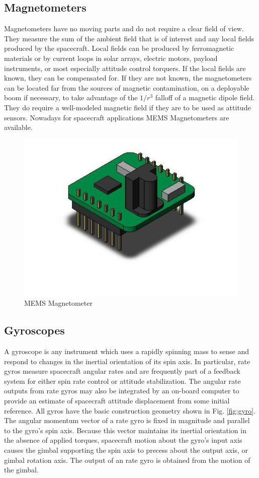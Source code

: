 \documentclass[11pt,a4paper]{report}
\begin{document}
\subsection{Magnetometers}
Magnetometers have no moving parts and do not require a clear field of view.
They measure the sum of the ambient field that is of interest and any local fields produced by the spacecraft. Local fields can be produced by ferromagnetic materials or by current loops in solar arrays, electric motors, payload instruments, or most especially attitude control torquers. If the local fields are known, they can be compensated for. If they are not known, the magnetometers can be located far from the sources of magnetic contamination, on a deployable boom if necessary, to take advantage of the $1/r^3$ falloff of a magnetic dipole field. They do require a well-modeled magnetic field if they are to be used as attitude sensors. Nowadays for spacecraft applications MEMS Magnetometers are available.

\begin{figure}[H]
 	\centering
 	\includegraphics[scale=1]{gfx/magnetometer.jpg}
    \caption{MEMS Magnetometer}
\end{figure}

\subsection{Gyroscopes}
A gyroscope is any instrument which uses a rapidly spinning mass to sense and respond to changes in the inertial orientation of its spin axis.
In particular, rate gyros measure spacecraft angular rates and are frequently part of a feedback system for either spin rate control or attitude stabilization. The angular rate outputs from rate gyros may also be integrated by an on-board computer to provide an estimate of spacecraft attitude displacement from some initial reference. 
All gyros have the basic construction geometry shown in Fig. \ref{fig:gyro}.
The angular momentum vector of a rate gyro is fixed in magnitude and parallel to the gyro's spin axis. Because this vector maintains its inertial orientation in the absence of applied torques, spacecraft motion about the gyro's input axis causes the gimbal supporting the spin axis to precess about the output axis, or gimbal rotation axis. The output of an rate gyro is obtained from the motion of the gimbal.
\end{document}
